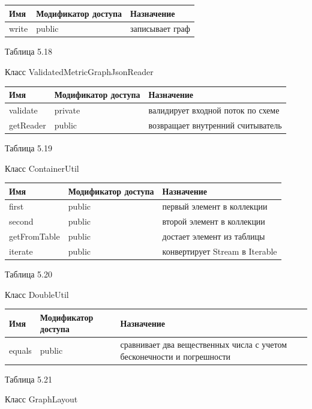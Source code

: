 \documentclass{../TechDoc}
\begin{document}
	\begin{tabular}{|p{5cm}|p{5cm}|p{5cm}|}
		\hline
		\textbf{Имя} & \textbf{Модификатор доступа} & \textbf{Назначение} \\
		\hline
		write& public& записывает граф\\
		
		\hline
	\end{tabular}
	\begin{flushright}
		Таблица 5.18
	\end{flushright}
	Класс ValidatedMetricGraphJsonReader
	
	\begin{tabular}{|p{5cm}|p{5cm}|p{5cm}|}
		\hline
		\textbf{Имя} & \textbf{Модификатор доступа} & \textbf{Назначение} \\
		\hline
		validate& private & валидирует входной поток по схеме\\
		\hline
		getReader& public & возвращает внутренний считыватель\\
		
		\hline
	\end{tabular}
	\begin{flushright}
		Таблица 5.19
	\end{flushright}
	Класс ContainerUtil
	
	\begin{tabular}{|p{5cm}|p{5cm}|p{5cm}|}
		\hline
		\textbf{Имя} & \textbf{Модификатор доступа} & \textbf{Назначение} \\
		\hline
		first& public & первый элемент в коллекции \\
		\hline
		second&public & второй элемент в коллекции\\
		\hline
		getFromTable&public & достает элемент из таблицы\\
		\hline
		iterate&public & конвертирует Stream в Iterable\\
		
		\hline
	\end{tabular}
	\begin{flushright}
		Таблица 5.20
	\end{flushright}
	Класс DoubleUtil
	
	\begin{tabular}{|p{5cm}|p{5cm}|p{5cm}|}
		\hline
		\textbf{Имя} & \textbf{Модификатор доступа} & \textbf{Назначение} \\
		\hline
		equals& public& сравнивает два вещественных числа с учетом бесконечности и погрешности \\
		
		\hline
	\end{tabular}
	\begin{flushright}
		Таблица 5.21
	\end{flushright}
	Класс GraphLayout
	
\end{document}
